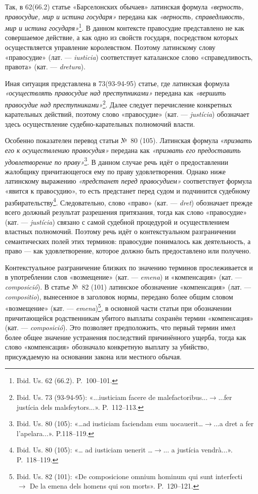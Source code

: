 Так, в 62(66.2) статье «Барселонских обычаев» латинская формула\emph{ «верность, правосудие, мир и истина государя»} передана как \emph{«верность, справедливость, мир и истина государя»}\footnote{Ibid. Us. 62 (66.2). P.~100--101.}. В данном контексте правосудие представлено не как совершаемое действие, а как одно из свойств государя, посредством которых осуществляется управление королевством. Поэтому латинскому слову «правосудие» (лат. --- \emph{iusticia}) соответствует каталанское слово «справедливость, правота» (кат. --- \emph{dretura}).

Иная ситуация представлена в 73(93-94-95) статье, где латинская формула \emph{«осуществлять правосудие над преступниками»} передана как \emph{«вершить правосудие над преступниками»}\footnote{Ibid. Us. 73 (93-94-95): «...iusticiam facere de malefactoribus...$\rightarrow$...fer justícia dels malsfeytors...». P.~112--113.}. Далее следует перечисление конкретных карательных действий, поэтому слово «правосудие» (кат. --- \emph{justícia}) обозначает здесь осуществление судебно-карательных полномочий власти.

Особенно показателен перевод статьи №~80 (105). Латинская формула «\emph{призвать его к осуществлению правосудия» }передана как \emph{«призвать его предоставить удовлетворение по праву»}\footnote{Ibid. Us. 80 (105): «…ad iusticiam faciendam eum uocauerit…$\rightarrow$...a dret a fer l’apelara...». P.118--119.}. В данном случае речь идёт о предоставлении жалобщику причитающегося ему по праву удовлетворения. Однако ниже латинскому выражению \emph{«предстанет перед правосудием»} соответствует формула «явится к правосудию», то есть предстанет перед судом и подчинится судебному разбирательству\footnote{Ibid. Us. 80 (105): «… ad iusticiam uenerit …$\rightarrow$... a justícia vendrà...». P.~118--119.}. Следовательно, слово «право» (кат. --- \emph{dret}) обозначает прежде всего должный результат разрешения притязания, тогда как слово «правосудие» (кат. --- \emph{justícia}) связано с самой судебной процедурой и осуществлением властных полномочий. Поэтому речь идёт о контекстуальном разграничении семантических полей этих терминов: правосудие понималось как деятельность, а право --- как удовлетворение, которое должно быть предоставлено или получено.

Контекстуальное разграничение близких по значению терминов прослеживается и в употреблении слов «возмещение» (кат. --- \emph{emena}) и «компенсация» (кат. --- \emph{composició}). В статье №~82 (101) латинское обозначение «компенсация» (лат. --- \emph{compositio}), вынесенное в заголовок нормы, передано более общим словом «возмещение» (кат. --- \emph{emena})\footnote{Ibid. Us. 82 (101): «De composicione omnium hominum qui sunt interfecti $\rightarrow$ De la emena dels homens qui son morts». P.~120--121.}, в основной части статьи при обозначении причитающейся родственникам убитого выплаты сохранён термин «компенсация» (кат. --- \emph{composició}). Это позволяет предположить, что первый термин имел более общее значение устранения последствий причинённого ущерба, тогда как слово «компенсация» обозначало конкретную выплату за убийство, присуждаемую на основании закона или местного обычая.

